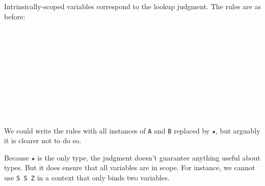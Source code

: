 Intrinsically-scoped variables correspond to the lookup judgment. The
rules are as before:

\begin{fence}
\begin{code}%
\>[0]\AgdaSpace{}%
\AgdaSpace{}%
\AgdaSymbol{:}\AgdaSpace{}%
\AgdaSpace{}%
\AgdaSpace{}%
\AgdaSpace{}%
\AgdaSpace{}%
\AgdaSpace{}%
\<%
\\
%
\\[\AgdaEmptyExtraSkip]%
\>[0][@{}l@{\AgdaIndent{0}}]%
\>[2]%
\>[93I]\AgdaSymbol{:}\AgdaSpace{}%
\AgdaSpace{}%
\AgdaSymbol{\{}\AgdaSpace{}%
\AgdaSymbol{\}}\<%
\\
\>[93I][@{}l@{\AgdaIndent{0}}]%
\>[5]\AgdaComment{---------}\<%
\\
\>[2][@{}l@{\AgdaIndent{0}}]%
\>[3]\AgdaSpace{}%
\AgdaSpace{}%
\AgdaOperator{\AgdaInductiveConstructor{,}}\AgdaSpace{}%
\AgdaSpace{}%
\AgdaSpace{}%
\<%
\\
%
\\[\AgdaEmptyExtraSkip]%
%
\>[2]\AgdaSpace{}%
\AgdaSymbol{:}\AgdaSpace{}%
\AgdaSpace{}%
\AgdaSymbol{\{}\AgdaSpace{}%
\AgdaSpace{}%
\AgdaSymbol{\}}\<%
\\
\>[2][@{}l@{\AgdaIndent{0}}]%
\>[4]%
\>[107I]\AgdaSpace{}%
\AgdaSpace{}%
\<%
\\
\>[.][@{}l@{}]\<[107I]%
\>[6]\AgdaComment{---------}\<%
\\
%
\>[4]\AgdaSpace{}%
\AgdaSpace{}%
\AgdaOperator{\AgdaInductiveConstructor{,}}\AgdaSpace{}%
\AgdaSpace{}%
\AgdaSpace{}%
\<%
\end{code}
\end{fence}

We could write the rules with all instances of \texttt{A} and \texttt{B}
replaced by \texttt{★}, but arguably it is clearer not to do so.

Because \texttt{★} is the only type, the judgment doesn't guarantee
anything useful about types. But it does ensure that all variables are
in scope. For instance, we cannot use \texttt{S\ S\ Z} in a context that
only binds two variables.

